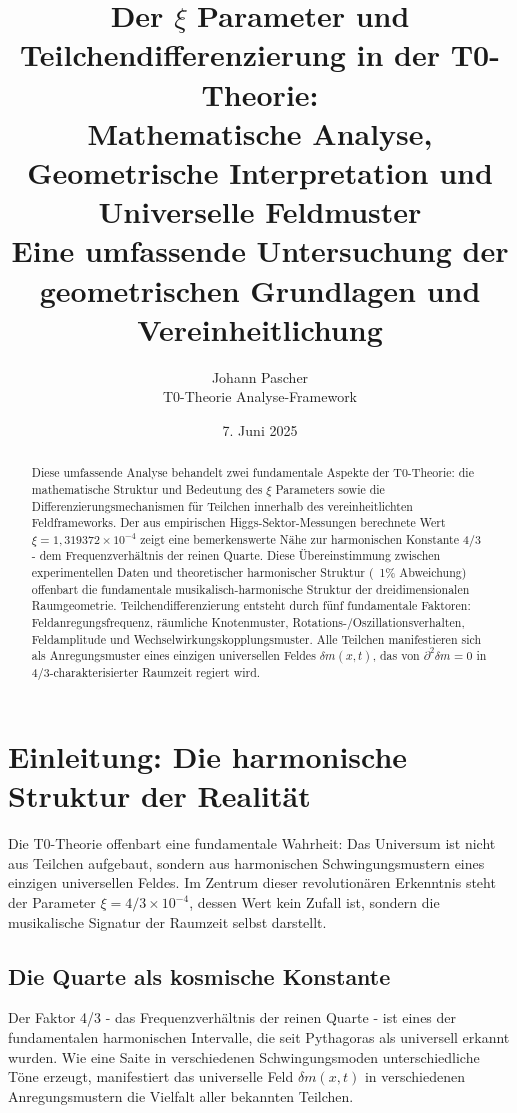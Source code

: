 \documentclass[12pt,a4paper]{article}
\title{Der $\xi$ Parameter und Teilchendifferenzierung in der T0-Theorie: \\
	Mathematische Analyse, Geometrische Interpretation und Universelle Feldmuster \\
	\large Eine umfassende Untersuchung der geometrischen Grundlagen und Vereinheitlichung}
\author{Johann Pascher \\
	T0-Theorie Analyse-Framework}
\date{7. Juni 2025}
\newcommand{\mytimes}{\ensuremath{\times}}
\begin{document}
	
	\maketitle
	
	\begin{abstract}
		Diese umfassende Analyse behandelt zwei fundamentale Aspekte der T0-Theorie: die mathematische Struktur und Bedeutung des $\xi$ Parameters sowie die Differenzierungsmechanismen für Teilchen innerhalb des vereinheitlichten Feldframeworks. Der aus empirischen Higgs-Sektor-Messungen berechnete Wert $\xi = 1,319372 \mytimes 10^{-4}$ zeigt eine bemerkenswerte Nähe zur harmonischen Konstante 4/3 - dem Frequenzverhältnis der reinen Quarte. Diese Übereinstimmung zwischen experimentellen Daten und theoretischer harmonischer Struktur (~1\% Abweichung) offenbart die fundamentale musikalisch-harmonische Struktur der dreidimensionalen Raumgeometrie. Teilchendifferenzierung entsteht durch fünf fundamentale Faktoren: Feldanregungsfrequenz, räumliche Knotenmuster, Rotations-/Oszillationsverhalten, Feldamplitude und Wechselwirkungskopplungsmuster. Alle Teilchen manifestieren sich als Anregungsmuster eines einzigen universellen Feldes $\delta m(x,t)$, das von $\partial^2\delta m = 0$ in 4/3-charakterisierter Raumzeit regiert wird.
	\end{abstract}
	
	\tableofcontents
	\newpage
	
	\section{Einleitung: Die harmonische Struktur der Realität}
	\label{sec:einleitung}
	
	Die T0-Theorie offenbart eine fundamentale Wahrheit: Das Universum ist nicht aus Teilchen aufgebaut, sondern aus harmonischen Schwingungsmustern eines einzigen universellen Feldes. Im Zentrum dieser revolutionären Erkenntnis steht der Parameter $\xi = 4/3 \times 10^{-4}$, dessen Wert kein Zufall ist, sondern die musikalische Signatur der Raumzeit selbst darstellt.
	
	\subsection{Die Quarte als kosmische Konstante}
	\label{subsec:quarte-konstante}
	
	Der Faktor 4/3 - das Frequenzverhältnis der reinen Quarte - ist eines der fundamentalen harmonischen Intervalle, die seit Pythagoras als universell erkannt wurden. Wie eine Saite in verschiedenen Schwingungsmoden unterschiedliche Töne erzeugt, manifestiert das universelle Feld $\delta m(x,t)$ in verschiedenen Anregungsmustern die Vielfalt aller bekannten Teilchen.
	
\end{document}
